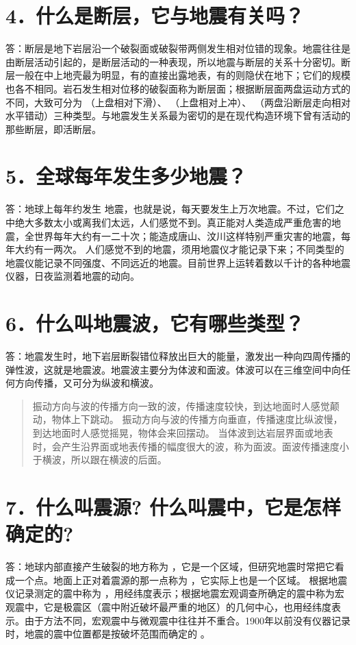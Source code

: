 \documentclass[a4paper,12pt,english]{sphinxmanual}
\begin{document}
\section{4．什么是断层，它与地震有关吗？}
\label{\detokenize{index:id6}}
答：断层是地下岩层沿一个破裂面或破裂带两侧发生相对位错的现象。地震往往是由断层活动引起的，是断层活动的一种表现，所以地震与断层的关系十分密切。断层一般在中上地壳最为明显，有的直接出露地表，有的则隐伏在地下；它们的规模也各不相同。岩石发生相对位移的破裂面称为断层面；根据断层面两盘运动方式的不同，大致可分为  （上盘相对下滑）、 （上盘相对上冲）、 （两盘沿断层走向相对水平错动）三种类型。与地震发生关系最为密切的是在现代构造环境下曾有活动的那些断层，即活断层。


\section{5．全球每年发生多少地震？}
\label{\detokenize{index:id7}}
答：地球上每年约发生   地震，也就是说，每天要发生上万次地震。不过，它们之中绝大多数太小或离我们太远，人们感觉不到。真正能对人类造成严重危害的地震，全世界每年大约有一二十次；能造成唐山、汶川这样特别严重灾害的地震，每年大约有一两次。
人们感觉不到的地震，须用地震仪才能记录下来；不同类型的地震仪能记录不同强度、不同远近的地震。目前世界上运转着数以千计的各种地震仪器，日夜监测着地震的动向。


\section{6．什么叫地震波，它有哪些类型？}
\label{\detokenize{index:id8}}
答：地震发生时，地下岩层断裂错位释放出巨大的能量，激发出一种向四周传播的弹性波，这就是地震波。地震波主要分为体波和面波。体波可以在三维空间中向任何方向传播，又可分为纵波和横波。
\begin{quote}

 振动方向与波的传播方向一致的波，传播速度较快，到达地面时人感觉颠动，物体上下跳动。
 振动方向与波的传播方向垂直，传播速度比纵波慢，到达地面时人感觉摇晃，物体会来回摆动。
 当体波到达岩层界面或地表时，会产生沿界面或地表传播的幅度很大的波，称为面波。面波传播速度小于横波，所以跟在横波的后面。
\end{quote}


\section{7．什么叫震源? 什么叫震中，它是怎样确定的?}
\label{\detokenize{index:id9}}
答：地球内部直接产生破裂的地方称为  ，它是一个区域，但研究地震时常把它看成一个点。地面上正对着震源的那一点称为  ，它实际上也是一个区域。
根据地震仪记录测定的震中称为  ，用经纬度表示；根据地震宏观调查所确定的震中称为宏观震中，它是极震区（震中附近破坏最严重的地区）的几何中心，也用经纬度表示。由于方法不同，宏观震中与微观震中往往并不重合。1900年以前没有仪器记录时，地震的震中位置都是按破坏范围而确定的  。
\end{document}
